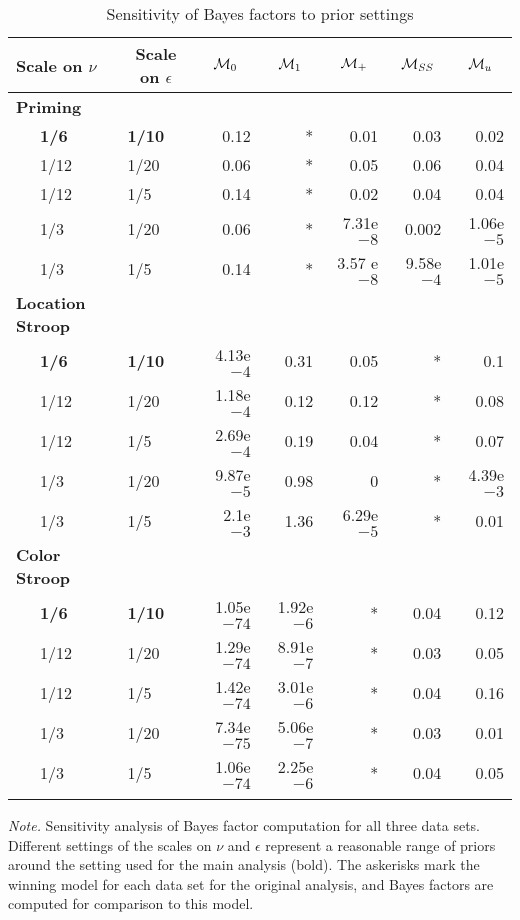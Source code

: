 \documentclass[english,man]{apa6}
\theoremstyle{definition}
\theoremstyle{definition}
\theoremstyle{remark}
\begin{document}
\begin{table}[tbp]
\begin{center}
\begin{threeparttable}
\caption{\label{tab:sensitivity-tab}Sensitivity of Bayes factors to prior settings}
\begin{tabular}{llrrrrr}
\toprule
Scale on $\nu$ & \multicolumn{1}{c}{Scale on $\epsilon$} & \multicolumn{1}{c}{${\cal M}_{0}$} & \multicolumn{1}{c}{${\cal M}_{1}$} & \multicolumn{1}{c}{${\cal M}_{+}$} & \multicolumn{1}{c}{${\cal M}_{SS}$} & \multicolumn{1}{c}{${\cal M}_{u}$}\\
\midrule
\bf{Priming} &  &  &  &  &  & \\
\ \ \ \bf{1/6} & \bf{1/10} & 0.12 & * & 0.01 & 0.03 & 0.02\\
\ \ \ 1/12 & 1/20 & 0.06 & * & 0.05 & 0.06 & 0.04\\
\ \ \ 1/12 & 1/5 & 0.14 & * & 0.02 & 0.04 & 0.04\\
\ \ \ 1/3 & 1/20 & 0.06 & * & 7.31e $-8$ & 0.002 & 1.06e $-5$\\
\ \ \ 1/3 & 1/5 & 0.14 & * & 3.57 e $-8$ & 9.58e $-4$ & 1.01e $-5$\\
\bf{Location Stroop} &  &  &  &  &  & \\
\ \ \ \bf{1/6} & \bf{1/10} & 4.13e $-4$ & 0.31 & 0.05 & * & 0.1\\
\ \ \ 1/12 & 1/20 & 1.18e $-4$ & 0.12 & 0.12 & * & 0.08\\
\ \ \ 1/12 & 1/5 & 2.69e $-4$ & 0.19 & 0.04 & * & 0.07\\
\ \ \ 1/3 & 1/20 & 9.87e $-5$ & 0.98 & 0 & * & 4.39e $-3$\\
\ \ \ 1/3 & 1/5 & 2.1e $-3$ & 1.36 & 6.29e $-5$ & * & 0.01\\
\bf{Color Stroop} &  &  &  &  &  & \\
\ \ \ \bf{1/6} & \bf{1/10} & 1.05e $-74$ & 1.92e $-6$ & * & 0.04 & 0.12\\
\ \ \ 1/12 & 1/20 & 1.29e $-74$ & 8.91e $-7$ & * & 0.03 & 0.05\\
\ \ \ 1/12 & 1/5 & 1.42e $-74$ & 3.01e $-6$ & * & 0.04 & 0.16\\
\ \ \ 1/3 & 1/20 & 7.34e $-75$ & 5.06e $-7$ & * & 0.03 & 0.01\\
\ \ \ 1/3 & 1/5 & 1.06e $-74$ & 2.25e $-6$ & * & 0.04 & 0.05\\
\bottomrule
\addlinespace
\end{tabular}
\begin{tablenotes}[para]
\textit{Note.} Sensitivity analysis of Bayes factor computation for all three data sets. Different settings of the scales on $\nu$ and $\epsilon$ represent a reasonable range of priors around the setting used for the main analysis (bold). The askerisks mark the winning model for each data set for the original analysis, and Bayes factors are computed for comparison to this model.
\end{tablenotes}
\end{threeparttable}
\end{center}
\end{table}
\end{document}
